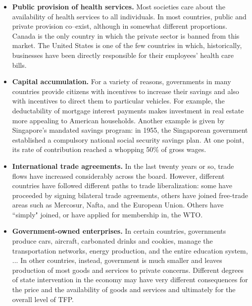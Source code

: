 \documentclass[letterpaper,12pt]{article}
\begin{document}
\begin{itemize}
\begin{itemize}
\item {\bf Public provision of health services.} Most societies
care about the availability of health services to all individuals.
In most countries, public and private provision co--exist, although
in somewhat different proportions. Canada is the only country in
which the private sector is banned from this market. The United
States is one of the few countries in which, historically,
businesses have been directly responsible for their employees' 
health care bills.

\item {\bf Capital accumulation.} For a variety of reasons, governments in many
countries provide citizens with incentives to increase their savings
and also with incentives to direct them to particular vehicles. For
example, the deductability of mortgage interest payments makes
investment in real estate more appealing to American
households. Another example is given by Singapore's mandated savings
program: in 1955, the Singaporean government established a
compulsory national social security savings plan. At one point, its
rate of contribution reached a whopping 50\% of gross wages.  

\item {\bf International trade agreements.} In the last twenty years
or so, trade flows have increased considerably across the board.
However, different countries have followed different paths to trade
liberalization: some have proceeded by signing bilateral trade
agreements, others have joined free-trade areas such as Mercosur,
Nafta, and the European Union. Others have ``simply" joined, or have
applied for membership in, the WTO. 

\item {\bf Government-owned enterprises.} In certain countries,
governments produce cars, aircraft, carbonated drinks and
cookies, manage the transportation networks, energy production, and
the entire education system, ... In other countries, instead,
government is much smaller and leaves production of most goods and
services to private concerns.  Different degrees of state
intervention in the economy may have very different consequences for
the price and the availability of goods and services and ultimately
for the overall level of TFP.

\end{itemize}


\end{itemize}
\end{document}
